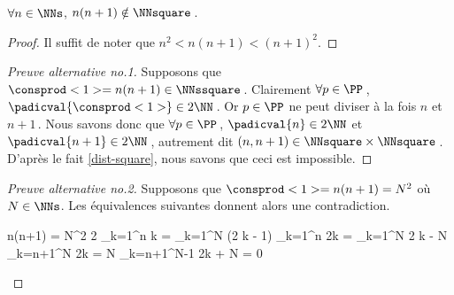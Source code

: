 \begin{fact} \label{case-2}
	 $\forall n \in \NNs$, $n(n+1) \notin \NNsquare$\,.
\end{fact}




\begin{proof}
	Il suffit de noter que $n^2 < n(n+1) < (n+1)^2$.
\end{proof}




\begin{proof}[Preuve alternative no.1]
    Supposons que $\consprod<1> = n(n+1) \in \NNssquare$\,.
    Clairement $\forall p \in \PP$\,, $\padicval{\consprod<1>} \in 2 \NN$\,.
    Or $p \in \PP$ ne peut diviser à la fois $n$ et $n+1$\,.
    Nous savons donc que $\forall p \in \PP$\,, 
    $\padicval{n} \in 2 \NN$ et $\padicval{n+1} \in 2 \NN$\,,
    autrement dit 
    $(n, n + 1) \in \NNsquare \times \NNsquare$\,.
    D'après le fait \ref{dist-square}, nous savons que ceci est impossible.
\end{proof}




\begin{proof}[Preuve alternative no.2]
     Supposons que $\consprod<1> = n(n+1) = N^2$ où $N \in \NNs$.
     Les équivalences suivantes donnent alors une contradiction.
	
	\medskip
	
	\begin{stepcalc}[style = ar*, ope = \iff]
		n(n+1) = N^2
		2 \dsum_{k=1}^{n} k = \dsum_{k=1}^{N} (2 k - 1)
	\explnext{}
		\dsum_{k=1}^{n} 2k = \dsum_{k=1}^{N} 2 k - N
		\dsum_{k=n+1}^{N} 2k = N
		\dsum_{k=n+1}^{N-1} 2k + N = 0
	\end{stepcalc}

	\vspace{-2ex}	
	\leavevmode
\end{proof}
